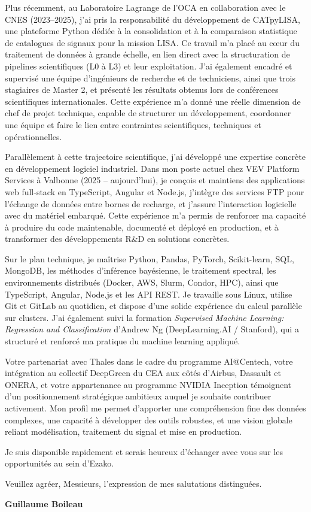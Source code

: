\documentclass[11pt,a4paper]{altacv}
\begin{document}
{Plus récemment, au Laboratoire Lagrange de l’OCA en collaboration avec le CNES (2023--2025), j’ai pris la responsabilité du développement de CATpyLISA, une plateforme Python dédiée à la consolidation et à la comparaison statistique de catalogues de signaux pour la mission LISA. Ce travail m’a placé au cœur du traitement de données à grande échelle, en lien direct avec la structuration de pipelines scientifiques (L0 à L3) et leur exploitation. J’ai également encadré et supervisé une équipe d’ingénieurs de recherche et de techniciens, ainsi que trois stagiaires de Master 2, et présenté les résultats obtenus lors de conférences scientifiques internationales. Cette expérience m’a donné une réelle dimension de chef de projet technique, capable de structurer un développement, coordonner une équipe et faire le lien entre contraintes scientifiques, techniques et opérationnelles.

Parallèlement à cette trajectoire scientifique, j’ai développé une expertise concrète en développement logiciel industriel. Dans mon poste actuel chez VEV Platform Services à Valbonne (2025 -- aujourd’hui), je conçois et maintiens des applications web full-stack en TypeScript, Angular et Node.js, j’intègre des services FTP pour l’échange de données entre bornes de recharge, et j’assure l’interaction logicielle avec du matériel embarqué. Cette expérience m’a permis de renforcer ma capacité à produire du code maintenable, documenté et déployé en production, et à transformer des développements R\&D en solutions concrètes.

Sur le plan technique, je maîtrise Python, Pandas, PyTorch, Scikit-learn, SQL, MongoDB, les méthodes d’inférence bayésienne, le traitement spectral, les environnements distribués (Docker, AWS, Slurm, Condor, HPC), ainsi que TypeScript, Angular, Node.js et les API REST. Je travaille sous Linux, utilise Git et GitLab au quotidien, et dispose d’une solide expérience du calcul parallèle sur clusters. J’ai également suivi la formation \textit{Supervised Machine Learning: Regression and Classification} d’Andrew Ng (DeepLearning.AI / Stanford), qui a structuré et renforcé ma pratique du machine learning appliqué.

Votre partenariat avec Thales dans le cadre du programme AI@Centech, votre intégration au collectif DeepGreen du CEA aux côtés d’Airbus, Dassault et ONERA, et votre appartenance au programme NVIDIA Inception témoignent d’un positionnement stratégique ambitieux auquel je souhaite contribuer activement. Mon profil me permet d’apporter une compréhension fine des données complexes, une capacité à développer des outils robustes, et une vision globale reliant modélisation, traitement du signal et mise en production.

Je suis disponible rapidement et serais heureux d’échanger avec vous sur les opportunités au sein d’Ezako.

Veuillez agréer, Messieurs, l’expression de mes salutations distinguées.

\textbf{Guillaume Boileau}

}
\end{document}
